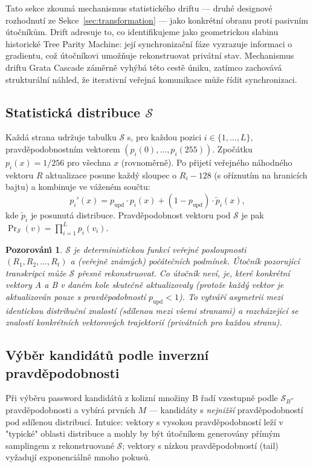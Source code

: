 \documentclass[11pt,a4paper]{article}
\newtheorem{observation}{Pozorov\'an\'{\i}}
\begin{document}
Tato sekce zkoumá mechanismus statistického driftu --- druhé designové rozhodnutí ze Sekce~\ref{sec:transformation} --- jako konkrétní obranu proti pasivním útočníkům. Drift adresuje to, co identifikujeme jako geometrickou slabinu historické Tree Parity Machine: její synchronizační fáze vyzrazuje informaci o gradientu, což útočníkovi umožňuje rekonstruovat privátní stav. Mechanismus driftu Grata Cascade záměrně vyhýbá této cestě úniku, zatímco zachovává strukturální náhled, že iterativní veřejná komunikace může řídit synchronizaci.

\subsection{Statistická distribuce $\mathcal{S}$}\label{sec:stat}

Každá strana udržuje tabulku $\mathcal{S}$ s, pro každou pozici $i \in \{1, \ldots, L\}$, pravděpodobnostním vektorem $(p_i(0), \ldots, p_i(255))$. Zpočátku $p_i(x) = 1/256$ pro všechna $x$ (rovnoměrně). Po přijetí veřejného náhodného vektoru $R$ aktualizace posune každý sloupec o $R_i - 128$ (s oříznutím na hranicích bajtu) a kombinuje ve váženém součtu:
\[
p_i'(x) = p_\text{upd} \cdot p_i(x) + (1 - p_\text{upd}) \cdot \tilde{p}_i(x),
\]
kde $\tilde{p}_i$ je posunutá distribuce. Pravděpodobnost vektoru pod $\mathcal{S}$ je pak $\Pr_\mathcal{S}(v) = \prod_{i=1}^{L} p_i(v_i)$.

\begin{observation}\label{obs:public-stat}
$\mathcal{S}$ je deterministickou funkcí veřejné posloupnosti $(R_1, R_2, \ldots, R_t)$ a (veřejně známých) počátečních podmínek. Útočník pozorující transkripci může $\mathcal{S}$ přesně rekonstruovat. Co útočník \emph{neví}, je, \emph{které konkrétní vektory} A a B v daném kole skutečně aktualizovaly (protože každý vektor je aktualizován pouze s pravděpodobností $p_\text{upd} < 1$). To vytváří asymetrii mezi identickou distribuční znalostí (sdílenou mezi všemi stranami) a rozcházející se znalostí konkrétních vektorových trajektorií (privátních pro každou stranu).
\end{observation}

\subsection{Výběr kandidátů podle inverzní pravděpodobnosti}\label{sec:selection}

Při výběru password kandidátů z kolizní množiny B řadí vzestupně podle $\mathcal{S}_B$-pravděpodobnosti a vybírá prvních $M$ --- kandidáty s \emph{nejnižší} pravděpodobností pod sdílenou distribucí. Intuice: vektory s vysokou pravděpodobností leží v "typické" oblasti distribuce a mohly by být útočníkem generovány přímým samplingem z rekonstruované $\mathcal{S}$; vektory s nízkou pravděpodobností (tail) vyžadují exponenciálně mnoho pokusů.
\end{document}
